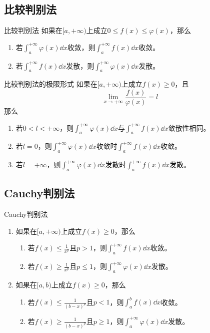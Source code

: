 \documentclass[lang = cn, scheme = chinese, thmcnt = section]{elegantbook}
\begin{document}
\subsection{比较判别法}

\begin{theorem}{比较判别法}
	如果在$[a,+\infty)$上成立$0\le f(x) \le \varphi(x)$，那么
	\begin{enumerate}
		\item 若$\displaystyle \int_a^{+\infty}\varphi(x)\dd x$收敛，则$\displaystyle \int_a^{+\infty}f(x)\dd x$收敛。
		\item 若$\displaystyle \int_a^{+\infty}f(x)\dd x$发散，则$\displaystyle \int_a^{+\infty}\varphi(x)\dd x$发散。
	\end{enumerate}
\end{theorem}

\begin{theorem}{比较判别法的极限形式}
	如果在$[a,+\infty)$上成立$f(x)\ge 0$，且
	$$
	\lim_{x\to+\infty}\frac{f(x)}{\varphi(x)}=l
	$$
	那么
	\begin{enumerate}
		\item 若$0<l<+\infty$，则$\displaystyle \int_a^{+\infty}\varphi(x)\dd x$与$\displaystyle \int_a^{+\infty}f(x)\dd x$敛散性相同。
		\item 若$l=0$，则$\displaystyle \int_a^{+\infty}\varphi(x)\dd x$收敛时$\displaystyle \int_a^{+\infty}f(x)\dd x$收敛。
		\item 若$l=+\infty$，则$\displaystyle \int_a^{+\infty}\varphi(x)\dd x$发散时$\displaystyle \int_a^{+\infty}f(x)\dd x$发散。
	\end{enumerate}
\end{theorem}

\subsection{Cauchy判别法}

\begin{theorem}{Cauchy判别法}
	\begin{enumerate}
		\item 如果在$[a,+\infty)$上成立$f(x)\ge 0$，那么
		\begin{enumerate}
			\item 若$\displaystyle f(x)\le\frac{1}{x^p}$且$p>1$，则$\displaystyle \int_a^{+\infty}f(x)\dd x$收敛。
			\item 若$\displaystyle f(x)\ge\frac{1}{x^p}$且$p\le 1$，则$\displaystyle \int_a^{+\infty}\varphi(x)\dd x$发散。
		\end{enumerate}
		\item 如果在$[a,b)$上成立$f(x)\ge 0$，那么
		\begin{enumerate}
			\item 若$\displaystyle f(x)\le\frac{1}{(b-x)^p}$且$p<1$，则$\displaystyle \int_a^{b}f(x)\dd x$收敛。
			\item 若$\displaystyle f(x)\ge\frac{1}{(b-x)^p}$且$p\ge 1$，则$\displaystyle \int_a^{+\infty}\varphi(x)\dd x$发散。
		\end{enumerate}
	\end{enumerate}
\end{theorem}
\end{document}
